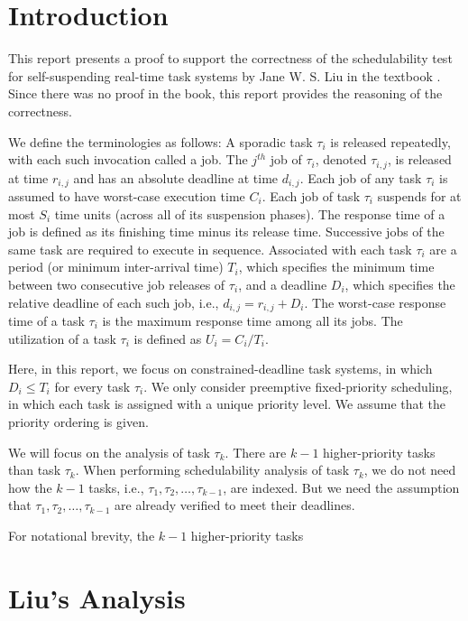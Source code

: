 \section{Introduction}

This report presents a proof to support the correctness of the schedulability test for self-suspending real-time task systems by Jane W. S. Liu in the textbook \cite{Liu:2000:RS:518501}. Since there was no proof in the book, this report provides the reasoning of the correctness.  

We define the
terminologies as follows:  A sporadic task
$\tau_i$ is released repeatedly, with each such invocation called a
job. The $j^{th}$ job of $\tau_i$, denoted $\tau_{i,j}$, is released
at time $r_{i,j}$ and has an absolute deadline at time $d_{i,j}$. Each
job of any task $\tau_i$ is assumed to have worst-case execution time $C_i$. Each job of task $\tau_i$ 
suspends for at most $S_i$ time units (across all of its suspension phases).
The response time
of a job is defined as its finishing time minus its release
time. Successive jobs of the same task are required to execute in
sequence. Associated with each task $\tau_i$ are a period (or minimum inter-arrival time) $T_i$, which
specifies the minimum time between two consecutive job releases of
$\tau_i$, and a deadline $D_i$, which specifies the relative deadline
of each such job, i.e., $d_{i,j}=r_{i,j}+D_i$. The worst-case response
time of a task $\tau_i$ is the maximum response time among all its
jobs.  The utilization of a task $\tau_i$ is defined as $U_i=C_i/T_i$.

Here, in this report, we focus on constrained-deadline task systems, in which $D_i \leq T_i$ for every task $\tau_i$. We only consider preemptive fixed-priority scheduling, in which each task is assigned with a unique priority level. We assume that the priority ordering is given.

We will focus on the analysis of task $\tau_k$. There are $k-1$ higher-priority tasks than task $\tau_k$. When performing schedulability analysis of task $\tau_k$, we do not need how the $k-1$ tasks, i.e., $\tau_1, \tau_2, \ldots, \tau_{k-1}$, are indexed. But we need the assumption that $\tau_1, \tau_2, \ldots, \tau_{k-1}$ are already verified to meet their deadlines. 

For notational brevity, the $k-1$ higher-priority tasks 

\section{Liu's Analysis}

